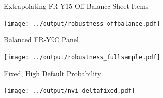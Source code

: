 \documentclass[12pt,envcountsect, leqno,xcolor=dvipsnames]{beamer}
\begin{document}
\begin{frame}{Extrapolating FR-Y15 Off-Balance Sheet Items}

\begin{center}
\texttt{[image: ../output/robustness\_offbalance.pdf]}
\end{center}

\end{frame}

\begin{frame}{Balanced FR-Y9C Panel}

\begin{center}
\texttt{[image: ../output/robustness\_fullsample.pdf]} 
\end{center}

\end{frame}

\begin{frame}{Fixed, High Default Probability}

\begin{center}
\texttt{[image: ../output/nvi\_deltafixed.pdf]} 
\end{center}

\end{frame}
\end{document}
